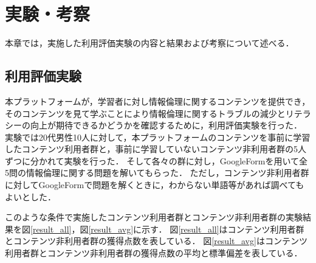 \section{実験・考察}\label{se4}

本章では，実施した利用評価実験の内容と結果および考察について述べる．

\subsection{利用評価実験}
本プラットフォームが，学習者に対し情報倫理に関するコンテンツを提供でき，そのコンテンツを見て学ぶことにより情報倫理に関するトラブルの減少とリテラシーの向上が期待できるかどうかを確認するために，利用評価実験を行った．
実験では20代男性10人に対して，本プラットフォームのコンテンツを事前に学習したコンテンツ利用者群と，事前に学習していないコンテンツ非利用者群の5人ずつに分かれて実験を行った．
そして各々の群に対し，GoogleFormを用いて全5問の情報倫理に関する問題を解いてもらった．
ただし，コンテンツ非利用者群に対してGoogleFormで問題を解くときに，わからない単語等があれば調べてもよいとした．

このような条件で実施したコンテンツ利用者群とコンテンツ非利用者群の実験結果を図\ref{result_all}，図\ref{result_avg}に示す．
図\ref{result_all}はコンテンツ利用者群とコンテンツ非利用者群の獲得点数を表している．
図\ref{result_avg}はコンテンツ利用者群とコンテンツ非利用者群の獲得点数の平均と標準偏差を表している．

